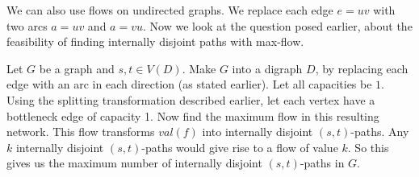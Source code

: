 \documentclass{Book}
\begin{document}
We can also use flows on undirected graphs. We replace each edge $e = uv$ with two arcs $a = uv$ and $a = vu$. Now we look at the question posed earlier, about the feasibility of finding internally disjoint paths with max-flow.

Let $G$ be a graph and $s, t \in V(D)$. Make $G$ into a digraph $D$, by replacing each edge with an arc in each direction (as stated earlier). Let all capacities be $1$. Using the splitting transformation described earlier, let each vertex have a bottleneck edge of capacity 1. Now find the maximum flow in this resulting network. This flow transforms $val(f)$ into internally disjoint $(s,t)$-paths. Any $k$ internally disjoint $(s,t)$-paths  would give rise to a flow of value $k$. So this gives us the maximum number of internally disjoint $(s,t)$-paths in $G$.
\end{document}
